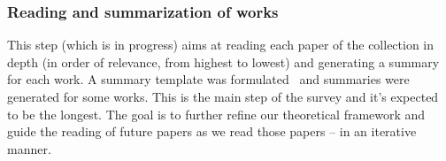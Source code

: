 \documentclass[12pt]{article}
\begin{document}
\subsubsection{Reading and summarization of works}
This step (which is in progress) aims at reading each paper of the collection in depth (in order of relevance, from highest to lowest) and generating a summary for each work.
A summary template was formulated~\cite{ref:paper-anal-template} and summaries were generated for some works.
This is the main step of the survey and it's expected to be the longest.
The goal is to further refine our theoretical framework and guide the reading of future papers as we read those papers
-- in an iterative manner.

\newpage
\printbibliography

%
%
\end{document}
